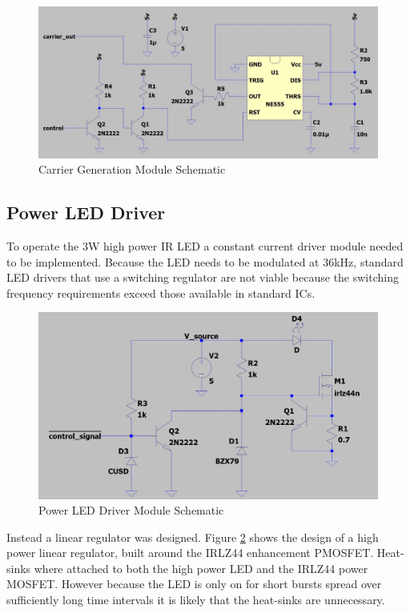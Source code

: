 \begin{figure}[H]
	\centering
	\includegraphics[width=.8\textwidth]{figures/design/carrier_waveform_generator_555.JPG}
	\caption{Carrier Generation Module Schematic}
	\label{fig:schematic_carrier_generation}
\end{figure}


\subsection{Power LED Driver}

To operate the 3W high power IR LED a constant current driver module needed to be implemented. Because the LED needs to be modulated at 36kHz, standard LED drivers that use a switching regulator are not viable because the switching frequency requirements exceed those available in standard ICs.

\begin{figure}[H]
	\centering
	\includegraphics[width=.8\textwidth]{figures/design/power_led_driver.JPG}
	\caption{Power LED Driver Module Schematic}
	\label{fig:schematic_power_led_driver}
\end{figure}

Instead a linear regulator was designed. Figure \ref{fig:schematic_power_led_driver} shows the design of a high power linear regulator, built around the IRLZ44 enhancement PMOSFET. Heat-sinks where attached to both the high power LED and the IRLZ44 power MOSFET. However because the LED is only on for short bursts spread over sufficiently long time intervals it is likely that the heat-sinks are unnecessary.


